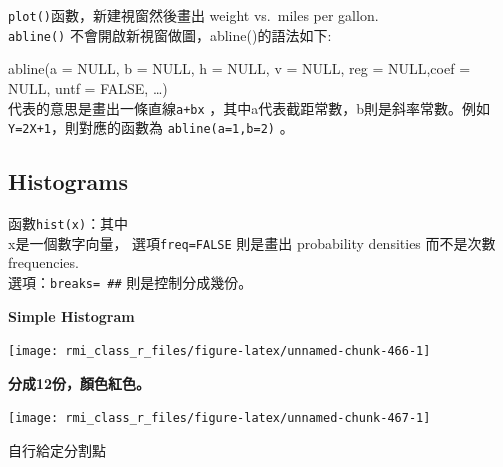 \documentclass[]{book}
\newenvironment{Shaded}{\begin{snugshade}}{\end{snugshade}}
\newcommand{\DataTypeTok}[1]{\textcolor[rgb]{0.13,0.29,0.53}{#1}}
\newcommand{\DecValTok}[1]{\textcolor[rgb]{0.00,0.00,0.81}{#1}}
\newcommand{\KeywordTok}[1]{\textcolor[rgb]{0.13,0.29,0.53}{\textbf{#1}}}
\newcommand{\NormalTok}[1]{#1}
\newcommand{\OperatorTok}[1]{\textcolor[rgb]{0.81,0.36,0.00}{\textbf{#1}}}
\newcommand{\StringTok}[1]{\textcolor[rgb]{0.31,0.60,0.02}{#1}}
\theoremstyle{definition}
\theoremstyle{definition}
\theoremstyle{definition}
\theoremstyle{remark}
\begin{document}
\texttt{plot()}函數，新建視窗然後畫出 weight vs.~miles per gallon.\\
\texttt{abline()} 不會開啟新視窗做圖，abline()的語法如下:

abline(a = NULL, b = NULL, h = NULL, v = NULL, reg = NULL,coef = NULL,
untf = FALSE, \ldots{})\\
代表的意思是畫出一條直線\texttt{a+bx}
，其中a代表截距常數，b則是斜率常數。例如\\
\texttt{Y=2X+1}，則對應的函數為 \texttt{abline(a=1,b=2)} 。

\hypertarget{histograms}{%
\subsection{Histograms}\label{histograms}}

函數\texttt{hist(x)}：其中\\
x是一個數字向量， 選項\texttt{freq=FALSE} 則是畫出 probability densities
而不是次數 frequencies.\\
選項：\texttt{breaks=\ \#\#} 則是控制分成幾份。

\textbf{Simple Histogram}

\begin{Shaded}
\end{Shaded}

\begin{center}\texttt{[image: rmi\_class\_r\_files/figure-latex/unnamed-chunk-466-1]} \end{center}

\textbf{分成12份，顏色紅色。}

\begin{Shaded}
\end{Shaded}

\begin{center}\texttt{[image: rmi\_class\_r\_files/figure-latex/unnamed-chunk-467-1]} \end{center}

自行給定分割點

\begin{Shaded}
\end{Shaded}
\end{document}
